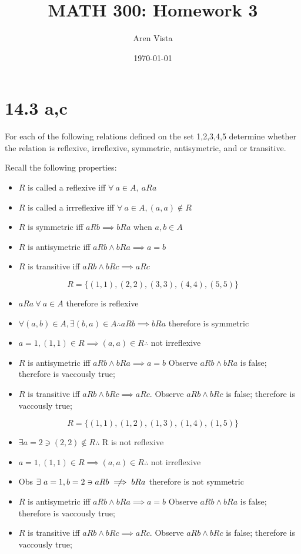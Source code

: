 \documentclass[11pt]{article}
\title{ MATH 300: Homework 3}
\author{ Aren Vista }
\date{\today}
\theoremstyle{plain}
\begin{document}
\maketitle	
\pagebreak

\section{14.3 a,c}

For each of the following relations defined on the set {1,2,3,4,5} determine whether the relation is reflexive, irreflexive, symmetric, antisymetric, and or transitive.

\begin{center}
Recall the following properties:
\end{center}

\begin{itemize}
    \item $R$ is called a reflexive iff $\forall ~a \in A, ~aRa$
    \item $R$ is called a irrreflexive iff $\forall ~a \in A, (a,a) \not\in R$
    \item $R$ is symmetric iff $aRb \implies bRa$ when $a,b \in A$
    \item $R$ is antisymetric iff $aRb \land bRa \implies a=b$ 
    \item $R$ is transitive iff $aRb \land bRc \implies aRc$ 
\end{itemize}

$$R = \{(1,1), (2,2), (3,3), (4,4), (5,5)\}$$
\begin{itemize}
    \item $aRa ~\forall ~a \in A$ therefore is reflexive
    \item $\forall (a,b) \in A, \exists (b,a) \in A \therefore aRb \implies bRa$ therefore is symmetric
    \item $a=1, (1,1) \in R \implies (a,a) \in R \therefore$ not irreflexive
    \item $R$ is antisymetric iff $aRb \land bRa \implies a=b$ Observe $aRb \land bRa$ is false; therefore is vaccously true;
    \item $R$ is transitive iff $aRb \land bRc \implies aRc$. Observe $aRb \land bRc$ is false; therefore is vaccously true;
\end{itemize}


$$R = \{(1,1), (1,2), (1,3), (1,4), (1,5)\}$$
\begin{itemize}
    \item $\exists a=2 \ni (2,2) \not\in R \therefore$ R is not reflexive
    \item $a=1, (1,1) \in R \implies (a,a) \in R \therefore$ not irreflexive
    \item Obs $\exists ~a=1, b=2 \ni aRb \centernot\implies bRa$ therefore is not symmetric
    \item $R$ is antisymetric iff $aRb \land bRa \implies a=b$ Observe $aRb \land bRa$ is false; therefore is vaccously true;
    \item $R$ is transitive iff $aRb \land bRc \implies aRc$. Observe $aRb \land bRc$ is false; therefore is vaccously true;
\end{itemize}
\end{document}
